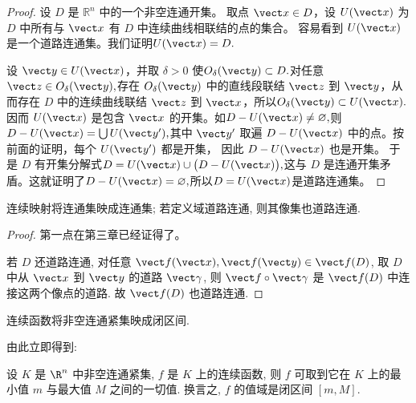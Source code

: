 \begin{proof}
	设 $D$ 是 $\mathbb{R}^n$ 中的一个非空连通开集。
	取点 $\vect x\in D$，设 $U(\vect x)$ 为 $D$ 中所有与 $\vect x$ 有 $D$ 中连续曲线相联结的点的集合。
	容易看到 $U(\vect x)$ 是一个道路连通集。我们证明$U(\vect x)=D.$
	
	设 $\vect y\in U(\vect x)$，并取 $\delta>0$ 使$O_\delta(\vect y)\subset D.$对任意$\vect z\in O_\delta(\vect y),$存在 $O_\delta(\vect y)$ 中的直线段联结 $\vect z$ 到 $\vect y$，从而存在 $D$ 中的连续曲线联结
	$\vect z$ 到 $\vect x$，所以$O_\delta(\vect y)\subset U(\vect x).$因而 $U(\vect x)$ 是包含 $\vect x$ 的开集。如$D-U(\vect x)\neq\varnothing,$则$D-U(\vect x)=\bigcup U(\vect y'),$其中 $\vect y'$ 取遍 $D-U(\vect x)$ 中的点。按前面的证明，每个 $U(\vect y')$ 都是开集，
	因此 $D-U(\vect x)$ 也是开集。	
	于是 $D$ 有开集分解式$D=U(\vect x)\cup\bigl(D-U(\vect x)\bigr),$这与 $D$ 是连通开集矛盾。这就证明了$D-U(\vect x)=\varnothing,$所以$D=U(\vect x)$是道路连通集。
\end{proof}


\begin{proposition}[连续映射将连通集映成连通集]
	\label{连续映射将连通集映成连通集}
	连续映射将连通集映成连通集; 若定义域道路连通,
	则其像集也道路连通.
\end{proposition}

\begin{proof}
	第一点在第三章已经证得了。

	若 $D$ 还道路连通, 对任意
	$\vect f(\vect x),\vect f(\vect y)\in\vect f(D)$,
	取 $D$ 中从 $\vect x$ 到 $\vect y$ 的道路
	$\vect\gamma$, 则 $\vect f\circ\vect\gamma$
	是 $\vect f(D)$ 中连接这两个像点的道路.
	故 $\vect f(D)$ 也道路连通.
\end{proof}

\begin{corollary}[连续函数将非空连通紧集映成闭区间]
	连续函数将非空连通紧集映成闭区间. 
\end{corollary}
由此立即得到:
\begin{proposition}[中间值定理]
	设 $K$ 是 $\R^n$ 中非空连通紧集, $f$ 是 $K$ 上的连续函数, 则 $f$ 可取到它在 $K$ 上的最小值 $m$ 与最大值 $M$ 之间的一切值. 换言之, $f$ 的值域是闭区间 $[m, M]$.
\end{proposition}
